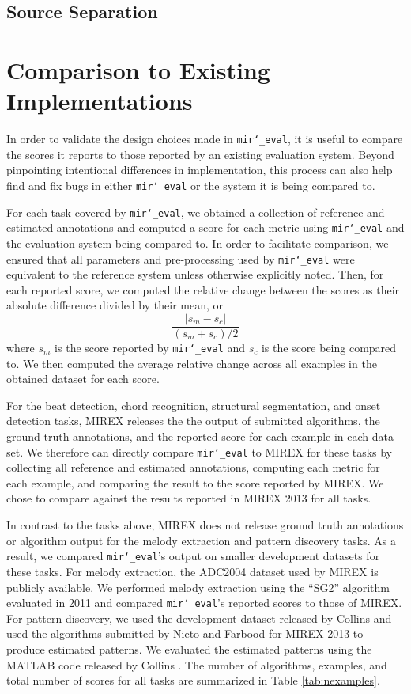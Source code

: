 \documentclass{article}
\def\mireval{\texttt{mir\char`_eval}}
\begin{document}
\subsection{Source Separation}


\section{Comparison to Existing Implementations}
\label{sec:comparison}

In order to validate the design choices made in \mireval{}, it is useful to compare the scores it reports to those reported by an existing evaluation system.
Beyond pinpointing intentional differences in implementation, this process can also help find and fix bugs in either \mireval{} or the system it is being compared to.

For each task covered by \mireval{}, we obtained a collection of reference and estimated annotations and computed a score for each metric using \mireval{} and the evaluation system being compared to.
In order to facilitate comparison, we ensured that all parameters and pre-processing used by \mireval{} were equivalent to the reference system unless otherwise explicitly noted.
Then, for each reported score, we computed the relative change between the scores as their absolute difference divided by their mean, or
$$
\frac{|s_m - s_c|}{(s_m + s_c)/2}
$$
where $s_m$ is the score reported by \mireval{} and $s_c$ is the score being compared to.
We then computed the average relative change across all examples in the obtained dataset for each score.

For the beat detection, chord recognition, structural segmentation, and onset detection tasks, MIREX releases the the output of submitted algorithms, the ground truth annotations, and the reported score for each example in each data set.
We therefore can directly compare \mireval{} to MIREX for these tasks by collecting all reference and estimated annotations, computing each metric for each example, and comparing the result to the score reported by MIREX.
We chose to compare against the results reported in MIREX 2013 for all tasks.

In contrast to the tasks above, MIREX does not release ground truth annotations or algorithm output for the melody extraction and pattern discovery tasks.
As a result, we compared \mireval{}'s output on smaller development datasets for these tasks.
For melody extraction, the ADC2004 dataset used by MIREX is publicly available.
We performed melody extraction using the ``SG2'' algorithm evaluated in 2011 \cite{salamon2011melody} and compared \mireval{}'s reported scores to those of MIREX.
For pattern discovery, we used the development dataset released by Collins \cite{Collins2013} and used the algorithms submitted by Nieto and Farbood \cite{nieto2013discovery} for MIREX 2013 to produce estimated patterns.
We evaluated the estimated patterns using the MATLAB code released by Collins \cite{Collins2013}.
The number of algorithms, examples, and total number of scores for all tasks are summarized in Table \ref{tab:nexamples}.
\end{document}
